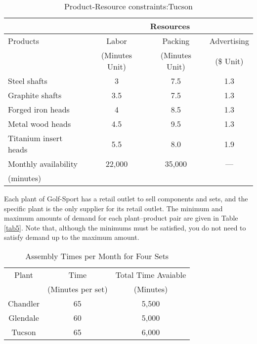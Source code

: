 \documentclass[12pt]{article}
\begin{document}
			\begin{table}[H]
				\centering
				\setlength{\belowcaptionskip}{0.1cm} 
				\caption{Product-Resource constraints:Tucson}
				\label{tab3}
				\begin{tabular}{lccc}
					\hline
					\hline
				 & \multicolumn{3}{c}{Resources} \\
				 \hline
				Products&Labor  &  Packing   &    Advertising     \\
				&(Minutes Unit)&(Minutes Unit)&(\$ Unit) \\
				Steel shafts& 3&7.5&1.3\\
				Graphite shafts& 3.5&7.5&1.3\\
				Forged iron heads&4&8.5&1.3\\
				Metal wood heads&4.5&9.5&1.3\\
				Titanium insert heads&5.5&8.0&1.9\\
				\hline
				Monthly availability&22,000&35,000&---\\
				(minutes)&&&\\
				\hline
				\hline  
				\end{tabular}
				\end{table}
	\noindent Each plant of Golf-Sport has a retail outlet to sell components and sets, and the specific plant is the only supplier for its retail outlet. The minimum and maximum amounts of demand for each plant–product pair are given in Table \ref{tab5}. Note that, although the minimums must be satisfied, you do not need to satisfy demand up to the maximum amount.
	\begin{table}[H]
		\centering
		\setlength{\belowcaptionskip}{0.1cm}
		\caption{Assembly Times per Month for Four Sets }
		\label{tab4}
		\begin{tabular}{ccc}
			\hline
			\hline
			Plant&Time&Total Time Avaiable\\
			&(Minutes per set)&(Minutes)\\
			\hline
			Chandler&65&5,500\\
			Glendale&60&5,000\\
			Tucson&65&6,000\\
			\hline
			\hline
		\end{tabular}
	\end{table}
\end{document}
